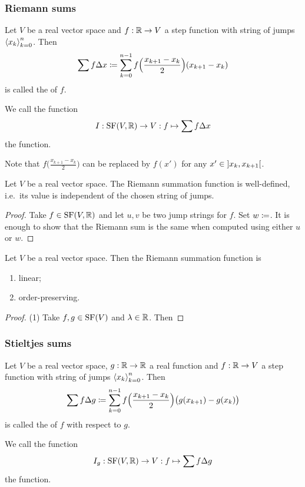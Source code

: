 \subsubsection{Riemann sums}
\begin{definition}
Let $V$ be a real vector space and $f: \mathbb{R}\to V$ a step function with string of jumps $\left\langle x_k \right\rangle_{k=0}^n$. Then
\[ \sum f \Delta{x} \coloneqq \sum_{k=0}^{n-1} f\Big(\frac{x_{k+1} - x_k}{2}\Big)(x_{k+1} - x_k) \]
is called the  of $f$.

We call the function
\[ I: \operatorname{SF}(V,\mathbb{R}) \to V: f \mapsto \sum f \Delta{x} \]
the  function.
\end{definition}
Note that $f\big(\frac{x_{k+1} - x_k}{2}\big)$ can be replaced by $f(x')$ for any $x'\in \interval[o]{x_{k}, x_{k+1}}$. 

\begin{lemma}
Let $V$ be a real vector space. The Riemann summation function is well-defined, i.e.\ its value is independent of the chosen string of jumps.
\end{lemma}
\begin{proof}
Take $f\in \operatorname{SF}(V,\mathbb{R})$ and let $u,v$ be two jump strings for $f$. Set $w \coloneqq $. It is enough to show that the Riemann sum is the same when computed using either $u$ or $w$.


\end{proof}

\begin{lemma}
Let $V$ be a real vector space. Then the Riemann summation function is
\begin{enumerate}
\item linear;
\item order-preserving.
\end{enumerate}
\end{lemma}
\begin{proof}
(1) Take $f,g\in \operatorname{SF}(V)$ and $\lambda\in \mathbb{R}$. Then 
\end{proof}

\subsubsection{Stieltjes sums}
\begin{definition}
Let $V$ be a real vector space, $g: \mathbb{R}\to \mathbb{R}$ a real function and $f: \mathbb{R}\to V$ a step function with string of jumps $\left\langle x_k \right\rangle_{k=0}^n$. Then
\[ \sum f \Delta{g} \coloneqq \sum_{k=0}^{n-1} f\Big(\frac{x_{k+1} - x_k}{2}\Big)\big(g(x_{k+1}) - g(x_k)\big) \]
is called the  of $f$ with respect to $g$.

We call the function
\[ I_g: \operatorname{SF}(V,\mathbb{R}) \to V: f \mapsto \sum f \Delta{g} \]
the  function.
\end{definition}

